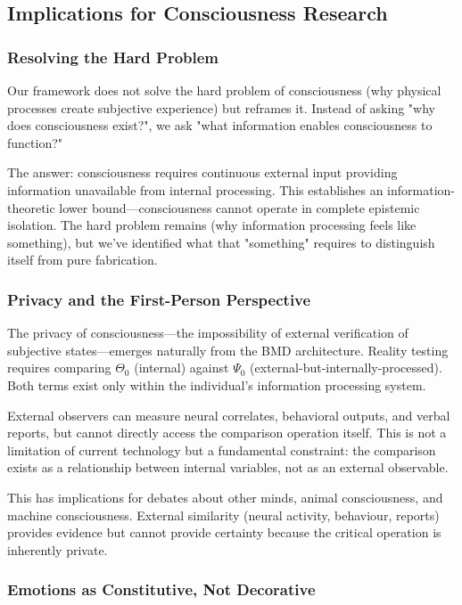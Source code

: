 \documentclass[11pt,a4paper]{article}
\begin{document}
\subsection{Implications for Consciousness Research}

\subsubsection{Resolving the Hard Problem}

Our framework does not solve the hard problem of consciousness (why physical processes create subjective experience) but reframes it. Instead of asking "why does consciousness exist?", we ask "what information enables consciousness to function?"

The answer: consciousness requires continuous external input providing information unavailable from internal processing. This establishes an information-theoretic lower bound—consciousness cannot operate in complete epistemic isolation. The hard problem remains (why information processing feels like something), but we've identified what that "something" requires to distinguish itself from pure fabrication.

\subsubsection{Privacy and the First-Person Perspective}

The privacy of consciousness—the impossibility of external verification of subjective states—emerges naturally from the BMD architecture. Reality testing requires comparing $\Theta_0$ (internal) against $\Psi_0$ (external-but-internally-processed). Both terms exist only within the individual's information processing system.

External observers can measure neural correlates, behavioral outputs, and verbal reports, but cannot directly access the comparison operation itself. This is not a limitation of current technology but a fundamental constraint: the comparison exists as a relationship between internal variables, not as an external observable.

This has implications for debates about other minds, animal consciousness, and machine consciousness. External similarity (neural activity, behaviour, reports) provides evidence but cannot provide certainty because the critical operation is inherently private.

\subsubsection{Emotions as Constitutive, Not Decorative}
\end{document}
